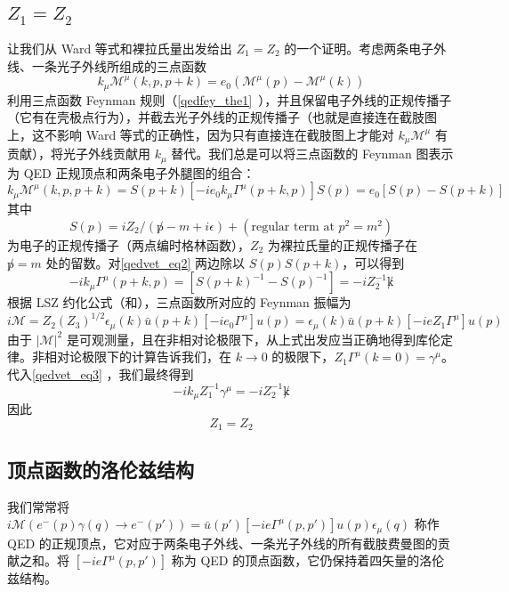 \subsection{$Z_1=Z_2$}
让我们从 Ward 等式和裸拉氏量出发给出 $Z_1=Z_2$ 的一个证明。考虑两条电子外线、一条光子外线所组成的三点函数
\begin{equation}
k_\mu \mathcal{M}^\mu(k,p,p+k)=e_0(\mathcal{M}^{\mu}(p)- \mathcal{M}^{\mu}(k))
\end{equation}
利用三点函数 Feynman 规则（\autoref{qedfey_the1}~），并且保留电子外线的正规传播子（它有在壳极点行为），并截去光子外线的正规传播子（也就是直接连在截肢图上，这不影响 Ward 等式的正确性，因为只有直接连在截肢图上才能对 $k_\mu \mathcal{M}^\mu$ 有贡献），将光子外线贡献用 $k_\mu$ 替代。我们总是可以将三点函数的 Feynman 图表示为 QED 正规顶点和两条电子外腿图的组合：
\begin{equation}\label{qedvet_eq2}
k_\mu \mathcal{M}^\mu(k,p,p+k) = S(p+k) [-ie_0k_\mu \Gamma^\mu(p+k,p)] S(p) =e_0[S(p)-S(p+k)]
\end{equation}
其中
\begin{equation}
S(p)=iZ_2/(\not p-m+i\epsilon)+(\text{regular term at } p^2=m^2)
\end{equation}
为电子的正规传播子（两点编时格林函数），$Z_2$ 为裸拉氏量的正规传播子在 $\not p=m$ 处的留数。对\autoref{qedvet_eq2} 两边除以 $S(p)S(p+k)$，可以得到
\begin{equation}\label{qedvet_eq3}
-ik_\mu \Gamma^\mu(p+k,p) = [S(p+k)^{-1}-S(p)^{-1}]= -i Z_2^{-1}\not k
\end{equation}
根据 LSZ 约化公式（和），三点函数所对应的 Feynman 振幅为
\begin{equation}
i\mathcal{M} = Z_2(Z_3)^{1/2}\epsilon_\mu(k)\bar u(p+k)[-ie_0\Gamma^\mu] u(p)=\epsilon_\mu(k)\bar u(p+k)[-i e Z_1\Gamma^\mu] u(p)
\end{equation}
由于 $|\mathcal{M}|^2$ 是可观测量，且在非相对论极限下，从上式出发应当正确地得到库伦定律。非相对论极限下的计算告诉我们，在 $k\rightarrow 0$ 的极限下，$Z_1 \Gamma^\mu(k=0) = \gamma^\mu$。代入\autoref{qedvet_eq3} ，我们最终得到
\begin{equation}
-i k_\mu Z_1^{-1} \gamma^\mu = -i Z_2^{-1}\not k
\end{equation}
因此
\begin{equation}
Z_1=Z_2
\end{equation}



\subsection{顶点函数的洛伦兹结构}
我们常常将 $i\mathcal{M}(e^-(p)\gamma(q)\rightarrow e^-(p'))=\bar u(p') [-ie\Gamma^\mu(p,p')]u(p) \epsilon_\mu(q)$ 称作 QED 的正规顶点，它对应于两条电子外线、一条光子外线的所有截肢费曼图的贡献之和。将 $[-ie\Gamma^\mu(p,p')]$ 称为 QED 的顶点函数，它仍保持着四矢量的洛伦兹结构。

